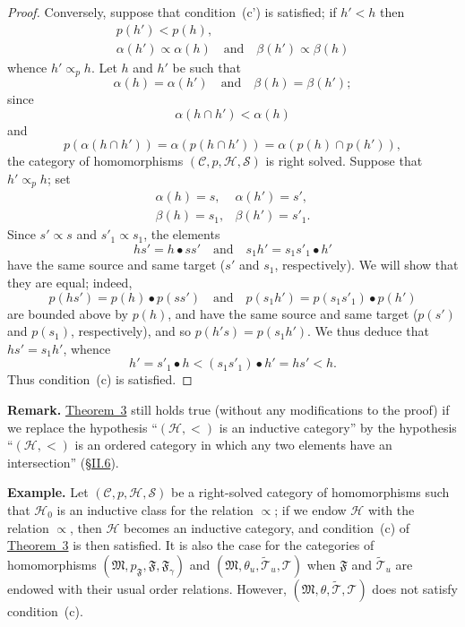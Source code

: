 \documentclass[a4paper,oneside,nobib,nofonts,notitlepage,notoc,nols,fleqn,justified]{tufte-book}
\newenvironment{rmenv}[1]
  {\phantomsection\par\medskip\noindent\textbf{#1.}\rmfamily}
  {\par\medskip}
\newcommand{\oldpage}[1]{{\reversemarginpar\marginnote{\raggedleft\footnotesize\textit{p.~#1}}}}
\newcommand{\CC}{\mathcal{C}}
\newcommand{\HH}{\mathcal{H}}
\renewcommand{\SS}{\mathcal{S}}
\newcommand{\MM}{\mathfrak{M}}
\newcommand{\FF}{\mathfrak{F}}
\newcommand{\TT}{\mathcal{T}}
\newcommand{\subs}{\mathrel{\propto}}
\begin{document}
\begin{proof}
  \oldpage{372}
  Conversely, suppose that condition~(c') is satisfied;
  if $h'<h$ then
  \[
    \begin{gathered}
      p(h')<p(h),
    \\\alpha(h')\subs\alpha(h)
      \quad\text{and}\quad
      \beta(h')\subs\beta(h)
    \end{gathered}
  \]
  whence $h'\subs_p h$.
  Let $h$ and $h'$ be such that
  \[
    \alpha(h) = \alpha(h')
    \quad\text{and}\quad
    \beta(h) = \beta(h');
  \]
  since
  \[
    \alpha(h\cap h')
    < \alpha(h)
  \]
  and
  \[
    p(\alpha(h\cap h'))
    = \alpha(p(h\cap h'))
    = \alpha(p(h)\cap p(h')),
  \]
  the category of homomorphisms $(\CC,p,\HH,\SS)$ is right solved.
  Suppose that $h'\subs_p h$;
  set
  \[
    \begin{array}{ll}
      \alpha(h)
      = s,
      &\alpha(h')
      = s',
    \\\beta(h)
      = s_1,
      &\beta(h')
      = s'_1.
    \end{array}
  \]
  Since $s'\subs s$ and $s'_1\subs s_1$, the elements
  \[
    hs'=h\bullet ss'
    \quad\text{and}\quad
    s_1h'=s_1s'_1\bullet h'
  \]
  have the same source and same target ($s'$ and $s_1$, respectively).
  We will show that they are equal;
  indeed,
  \[
    p(hs')=p(h)\bullet p(ss')
    \quad\text{and}\quad
    p(s_1h')=p(s_1s'_1)\bullet p(h')
  \]
  are bounded above by $p(h)$, and have the same source and same target ($p(s')$ and $p(s_1)$, respectively), and so $p(h's)=p(s_1h')$.
  We thus deduce that $hs'=s_1h'$, whence
  \[
      h'
      = s'_1\bullet h < (s_1s'_1)\bullet h'
    = hs'
    < h.
  \]
  Thus condition~(c) is satisfied.
\end{proof}

\begin{rmenv}{Remark}
  \hyperref[theorem:3]{Theorem~3} still holds true (without any modifications to the proof) if we replace the hypothesis ``$(\HH,<)$ is an inductive category'' by the hypothesis ``$(\HH,<)$ is an ordered category in which any two elements have an intersection'' (\hyperref[section:ii.6]{§II.6}).
\end{rmenv}

\begin{rmenv}{Example}
  Let $(\CC,p,\HH,\SS)$ be a right-solved category of homomorphisms such that $\HH_0$ is an inductive class \cite{3a} for the relation $\subs$;
  if we endow $\HH$ with the relation $\subs$, then $\HH$ becomes an inductive category, and condition~(c) of \hyperref[theorem:3]{Theorem~3} is then satisfied.
  It is also the case for the categories of homomorphisms $(\MM,p_\FF,\FF,\FF_\gamma)$ and $(\MM,\theta_u,\widetilde{\TT}_u,\TT)$ when $\FF$ and $\widetilde{\TT}_u$ are endowed with their usual order relations.
  However, $(\MM,\theta,\widetilde{\TT},\TT)$ does not satisfy condition~(c).
\end{rmenv}
\end{document}

